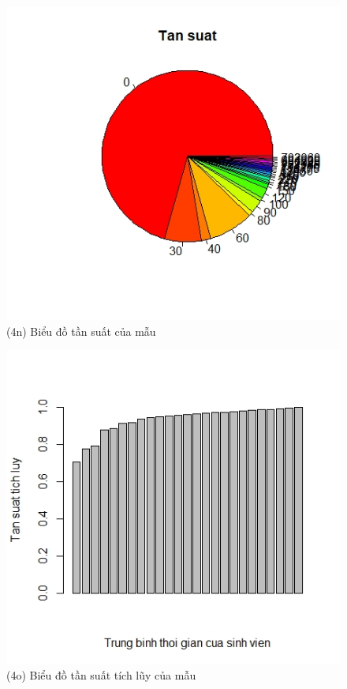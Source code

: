 \documentclass[a4paper]{article}
\theoremstyle{definition}
\begin{document}
\begin{figure}[!ht]
    \centering
    \includegraphics[scale=0.4]{Pics/q4n-file1.jpeg}
    \caption{(4n) Biểu đồ tần suất của mẫu}
    \label{fig:my_label}
\end{figure}
\newpage
\begin{figure}[!ht]
    \centering
    \includegraphics[scale=0.4]{Pics/q4o-file1.jpeg}
    \caption{(4o) Biểu đồ tần suất tích lũy của mẫu }
    \label{fig:my_label}
\end{figure}
\newpage
\end{document}
